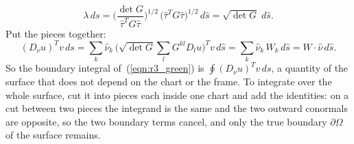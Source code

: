 \begin{equation*}
\lambda\, ds = \Big(\frac{\det G}{\hat\tau^TG\hat\tau}\Big)^{1/2}\, \big(\hat\tau^TG\hat\tau\big)^{1/2}\, d\hat s = \sqrt{\det G}\; d\hat s .
\end{equation*}
Put the pieces together:
\begin{equation*}
(D_\nu u)^Tv\, ds = \sum_k \hat\nu_k\,\Big(\sqrt{\det G}\sum_l G^{kl}D_lu\Big)^Tv\, d\hat s = \sum_k \hat\nu_k\, W_k\, d\hat s = W\cdot\hat\nu\, d\hat s .
\end{equation*}
So the boundary integral of~(\ref{eqn:r3_green}) is $\oint(D_\nu u)^Tv\, ds$, a quantity of the surface that does not depend on the chart or the frame. To integrate over the whole surface, cut it into pieces each inside one chart and add the identities: on a cut between two pieces the integrand is the same and the two outward conormals are opposite, so the two boundary terms cancel, and only the true boundary $\partial\Omega$ of the surface remains.

